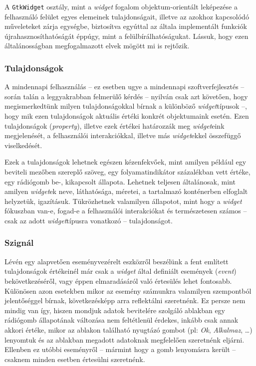 A \texttt{GtkWidget} osztály, mint a \textit{widget} fogalom objektum-orientált leképezése a felhasználó felület egyes elemeinek tulajdonságait, illetve az azokhoz kapcsolódó műveleteket zárja egységbe, biztosítva egyúttal az általa implementált funkciók újrahasznosíthatóságát éppúgy, mint a felülbírálhatóságukat. Lássuk, hogy ezen általánosságban megfogalmazott elvek mögött mi is rejtőzik.

\subsubsection{Tulajdonságok}

A mindennapi felhasználás -- ez esetben ugye a mindennapi szoftverfejlesztés -- során talán a leggyakrabban felmerülő kérdés -- nyilván csak azt követően, hogy megismerkedtünk milyen tulajdonságokkal bírnak a különböző \textit{widget}típusok --, hogy mik ezen tulajdonságok aktuális értéki konkrét objektumaink esetén. Ezen tulajdonságok (\textit{property}), illetve ezek értékei határozzák meg \textit{widget}eink megjelenését, a felhasználói interakciókkal, illetve más \textit{widget}ekkel összefüggő viselkedését.

Ezek a tulajdonságok lehetnek egészen kézenfekvőek, mint amilyen például egy beviteli mezőben szereplő szöveg, egy folyamatindikátor százalékban vett értéke, egy rádiógomb be-, kikapcsolt állapota. Lehetnek teljesen általánosak, mint amilyen \textit{widget}ek neve, láthatósága, méretei, a tartalmazó konténerben elfoglalt helyzetük, igazításuk. Tükrözhetnek valamilyen állapotot, mint hogy a \textit{widget} fókuszban van-e, fogad-e a felhasználói interakciókat és természetesen számos -- csak az adott \textit{widget}típusra vonatkozó -- tulajdonságot.

\subsubsection{Szignál}

Lévén egy alapvetően eseményvezérelt eszközről beszélünk a fent említett tulajdonságok értékeinél már csak a \textit{widget} által definiált események (\textit{event}) bekövetkezéséről, vagy éppen elmaradásáról való értesülés lehet fontosabb. Különösen azon esetekben mikor az esemény számunkra valamilyen szempontból jelentőséggel bírnak, következésképp arra reflektálni szeretnénk. Ez persze nem mindig van így, hiszen mondjuk adatok bevitelére szolgáló ablakban egy rádiógomb állapotának változása nem feltétlenül érdekes, inkább csak annak akkori értéke, mikor az ablakon található nyugtázó gombot (pl: \textit{Ok}, \textit{Alkalmaz}, \dots) lenyomtuk és az ablakban megadott adatoknak megfelelően szeretnénk eljárni. Ellenben ez utóbbi eseményről -- mármint hogy a gomb lenyomásra került -- csaknem minden esetben értesülni szeretnénk.

